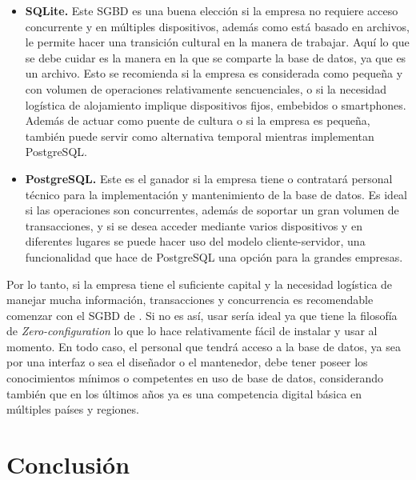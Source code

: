 \documentclass[12pt]{article}
\begin{document}
\begin{itemize}
	\item \textbf{SQLite.} Este SGBD es una buena elección si la empresa no requiere acceso concurrente y en múltiples dispositivos, además como está basado en archivos, le permite hacer una transición cultural en la manera de trabajar. Aquí lo que se debe cuidar es la manera en la que se comparte la base de datos, ya que es un archivo. Esto se recomienda si la empresa es considerada como pequeña y con volumen de operaciones relativamente sencuenciales, o si la necesidad logística de alojamiento implique dispositivos fijos, embebidos o smartphones. Además de actuar como puente de cultura o si la empresa es pequeña, también puede servir como alternativa temporal mientras implementan PostgreSQL.
	\item \textbf{PostgreSQL.} Este es el ganador si la empresa tiene o contratará personal técnico para la implementación y mantenimiento de la base de datos. Es ideal si las operaciones son concurrentes, además de soportar un gran volumen de transacciones, y si se desea acceder mediante varios dispositivos y en diferentes lugares se puede hacer uso del modelo cliente-servidor, una funcionalidad que hace de PostgreSQL una opción para la grandes empresas. 
\end{itemize}

Por lo tanto, si la empresa tiene el suficiente capital y la necesidad logística de manejar mucha información, transacciones y concurrencia es recomendable comenzar con el SGBD de \textbf{\textcite{postgresql}}. Si no es así, usar \textbf{\textcite{sqlite}} sería ideal ya que tiene la filosofía de \textit{Zero-configuration} lo que lo hace relativamente fácil de instalar y usar al momento. En todo caso, el personal que tendrá acceso a la base de datos, ya sea por una interfaz o sea el diseñador o el mantenedor, debe tener poseer los conocimientos mínimos o competentes en uso de base de datos, considerando también que en los últimos años ya es una competencia digital básica en múltiples países y regiones.
\newpage

\section*{\centering Conclusión}

\end{document}
